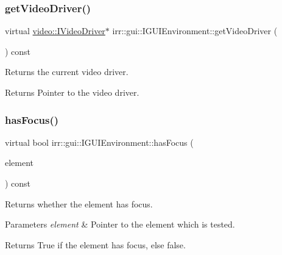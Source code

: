 \subsubsection{\texorpdfstring{get\+Video\+Driver()}{getVideoDriver()}}
{\footnotesize\ttfamily virtual \hyperlink{classirr_1_1video_1_1IVideoDriver}{video\+::\+I\+Video\+Driver}$\ast$ irr\+::gui\+::\+I\+G\+U\+I\+Environment\+::get\+Video\+Driver (\begin{DoxyParamCaption}{ }\end{DoxyParamCaption}) const\hspace{0.3cm}{\ttfamily [pure virtual]}}



Returns the current video driver. 

\begin{DoxyReturn}{Returns}
Pointer to the video driver. 
\end{DoxyReturn}
\mbox{\label{classirr_1_1gui_1_1IGUIEnvironment_a88c483f30a0f35debed70e8e51836552}} 
\subsubsection{\texorpdfstring{has\+Focus()}{hasFocus()}}
{\footnotesize\ttfamily virtual bool irr\+::gui\+::\+I\+G\+U\+I\+Environment\+::has\+Focus (\begin{DoxyParamCaption}\item[{\hyperlink{classirr_1_1gui_1_1IGUIElement}{I\+G\+U\+I\+Element} $\ast$}]{element }\end{DoxyParamCaption}) const\hspace{0.3cm}{\ttfamily [pure virtual]}}



Returns whether the element has focus. 


\begin{DoxyParams}{Parameters}
{\em element} & Pointer to the element which is tested. \\
\hline
\end{DoxyParams}
\begin{DoxyReturn}{Returns}
True if the element has focus, else false. 
\end{DoxyReturn}
\mbox{\label{classirr_1_1gui_1_1IGUIEnvironment_a6e847a40e5c97c846f2d654605ae13a0}} 
